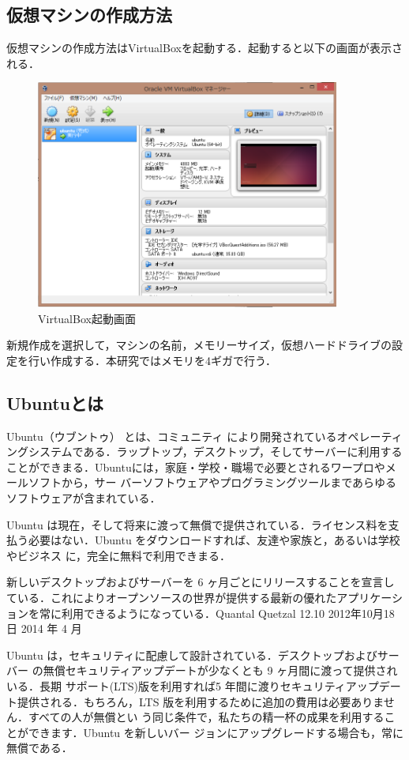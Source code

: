 \subsection{仮想マシンの作成方法}
仮想マシンの作成方法はVirtualBoxを起動する．起動すると以下の画面が表示される．

\begin{figure}[hb]
\centering
\includegraphics[width=10cm]{kasou.png}
\caption{VirtualBox起動画面}\label{kasou.png}
\end{figure}
新規作成を選択して，マシンの名前，メモリーサイズ，仮想ハードドライブの設定を行い作成する．本研究ではメモリを4ギガで行う．

\clearpage

\subsection{Ubuntuとは}
Ubuntu（ウブントゥ） とは、コミュニティ により開発されているオペレーティングシステムである．ラップトップ，デスクトップ，そしてサーバーに利用することができまる．Ubuntuには，家庭・学校・職場で必要とされるワープロやメールソフトから，サー バーソフトウェアやプログラミングツールまであらゆるソフトウェアが含まれている．

Ubuntu は現在，そして将来に渡って無償で提供されている．ライセンス料を支払う必要はない．Ubuntu をダウンロードすれば、友達や家族と，あるいは学校やビジネス に，完全に無料で利用できまる．

新しいデスクトップおよびサーバーを 6 ヶ月ごとにリリースすることを宣言している．これによりオープンソースの世界が提供する最新の優れたアプリケーションを常に利用できるようになっている．Quantal Quetzal 12.10 2012年10月18日 2014 年 4 月 

Ubuntu は，セキュリティに配慮して設計されている．デスクトップおよびサーバー の無償セキュリティアップデートが少なくとも 9 ヶ月間に渡って提供されいる．長期 サポート(LTS)版を利用すれば5 年間に渡りセキュリティアップデート提供される．もちろん，LTS 版を利用するために追加の費用は必要ありません．すべての人が無償とい う同じ条件で，私たちの精一杯の成果を利用することができます．Ubuntu を新しいバー ジョンにアップグレードする場合も，常に無償である．

